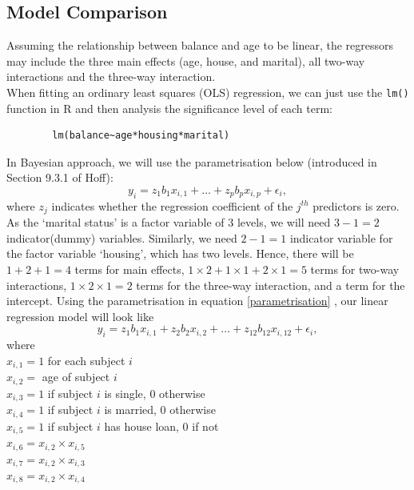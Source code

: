\documentclass[a4page]{article}
\begin{document}
	\subsection{Model Comparison\label{2.1}}
	Assuming the relationship between balance and age to be linear, the regressors may include the three main effects (age, house, and marital), all two-way interactions and the three-way interaction.\\
	When fitting an ordinary least squares (OLS) regression, we can just use the \verb|lm()| function in R and then analysis the significance level of each term:
	\begin{verbatim}
        lm(balance~age*housing*marital)
    \end{verbatim}
	In Bayesian approach, we will use the parametrisation below (introduced in Section 9.3.1 of Hoff):
	\begin{equation}
	y_i=z_1b_1x_{i,1}+\dots+z_pb_px_{i,p}+\epsilon_i,\label{parametrisation}
	\end{equation}
	where $z_j$ indicates whether the regression coefficient of the $j^{th}$ predictors is zero.\\
	As the `marital status' is a factor variable of 3 levels, we will need $3-1=2$ indicator(dummy) variables. Similarly, we need $2-1=1$ indicator variable for the factor variable `housing', which has two levels. Hence, there will be $1+2+1=4$ terms for main effects, $1\times2+1\times1+2\times1=5$ terms for two-way interactions, $1\times2\times1=2$ terms for the three-way interaction, and a term for the intercept. Using the parametrisation in equation \ref{parametrisation}
	, our linear regression model will look like
	\begin{equation}
	y_i=z_1b_1x_{i,1}+z_2b_2x_{i,2}+\dots+z_{12}b_{12}x_{i,12}+\epsilon_i,\label{full-model}
	\end{equation}
    where\\
	$x_{i,1}=1$ for each subject $i$\\
	$x_{i,2}=$ age of subject $i$\\
	$x_{i,3}=1$ if subject $i$ is single, 0 otherwise\\
	$x_{i,4}=1$ if subject $i$ is married, 0 otherwise\\
	$x_{i,5}=1$ if subject $i$ has house loan, 0 if not\\
	$x_{i,6}=x_{i,2}\times x_{i,5}$\\
	$x_{i,7}=x_{i,2}\times x_{i,3}$\\
	$x_{i,8}=x_{i,2}\times x_{i,4}$\\
\end{document}

